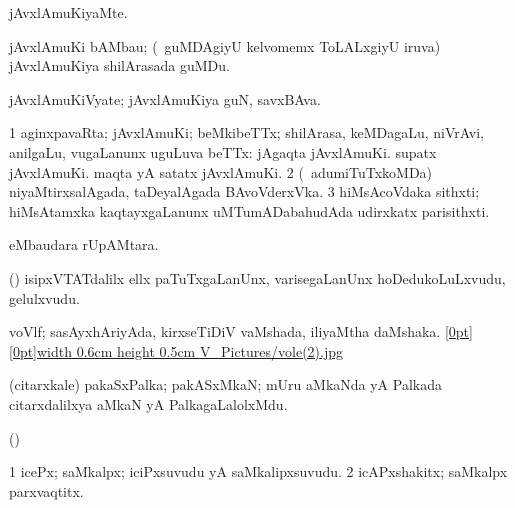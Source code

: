{{{{{{{{{{{{\bentry 
{} 
\gl{\kirxvi}
\expl{}
\bmng
 jAvxlAmuKiyaMte. 
\emng
\eentry

\bentry 
{}
\gl{\nA}
\expl{}
\bmng
 jAvxlAmuKi bAMbau; (\sA\ guMDAgiyU kelvomemx ToLALxgiyU iruva) jAvxlAmuKiya shilArasada guMDu. 
\emng
\eentry

\bentry 
{} 
\gl{\nA}
\expl{}
\bmng
\emng
\eentry

\bentry
{} 
\gl{\nA}
\expl{}
\bmng
 jAvxlAmuKiVyate; jAvxlAmuKiya guN, savxBAva. 
\emng
\eentry

\bentry 
{} 
\gl{\nA}
\bmng
\bnum
\num{1} aginxpavaRta; jAvxlAmuKi; beMkibeTTx; shilArasa, keMDagaLu, niVrAvi, anilgaLu, \mo vugaLanunx uguLuva beTTx:  jAgaqta jAvxlAmuKi.  supatx jAvxlAmuKi.  maqta yA satatx jAvxlAmuKi. 
\num{2} (\kanmu\ adumiTuTxkoMDa) niyaMtirxsalAgada, taDeyalAgada BAvoVderxVka. 
\num{3} hiMsAcoVdaka sithxti; hiMsAtamxka kaqtayxgaLanunx uMTumADabahudAda udirxkatx parisithxti. 
\enum
\emng
\eentry

\bentry
{} 
\gl{\nA}
\expl{}
\bmng
  eMbaudara rUpAMtara. 
\emng
\eentry

\bentry 
{} 
\gl{\nA}
\expl{}
\bmng
 (\pArxparx) isipxVTATdalilx ellx paTuTxgaLanUnx, varisegaLanUnx hoDedukoLuLxvudu, gelulxvudu. 
\emng
\eentry

\bentry 
{} 
\gl{\nA}
\expl{}
\bmng
 voVlf; sasAyxhAriyAda, kirxseTiDiV vaMshada, iliyaMtha daMshaka. \quad \hyperlink{vole(2)figure}{\raisebox{-0.15cm}[0pt][0pt]{\pdfimage width 0.6cm height 0.5cm {V_Pictures/vole(2).jpg}}} 
\emng
\eentry

\bentry
{} 
\gl{\nA}
\expl{}
\bmng
 (citarxkale) pakaSxPalka; pakASxMkaN; mUru aMkaNda yA Palkada citarxdalilxya aMkaN yA PalkagaLalolxMdu. 
\emng
\eentry

\bentry 
{} 
\gl{\gu}
\expl{}
\bmng
 (\pArxvi)  
\emng
\eentry

\bentry
{} 
\gl{\nA}
\expl{}
\bmng
\bnum
\num{1} icePx; saMkalpx; iciPxsuvudu yA saMkalipxsuvudu. 
\num{2} icAPxshakitx; saMkalpx parxvaqtitx. 
\enum
\emng

}}}}}}}}}}}}
